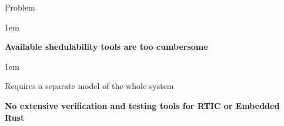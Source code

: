 \begin{frame}{Problem}
    \begin{itemize-size}{1em}
        \item \textbf{Available shedulability tools are too cumbersome}
            \begin{itemize-size}{1em}
                \item Requires a separate model of the whole system 
            \end{itemize-size}
        \item \textbf{No extensive verification and testing tools for RTIC or Embedded Rust}
        
    \end{itemize-size}
    
\end{frame}
